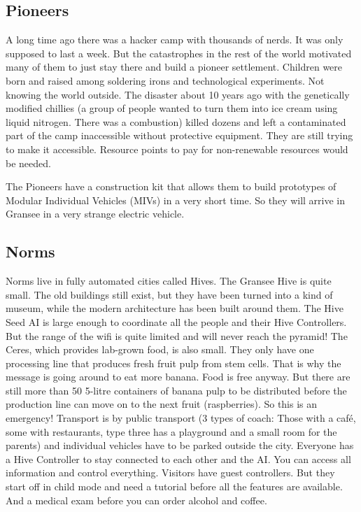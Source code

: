 \subsection{Pioneers}

A long time ago there was a hacker camp with thousands of nerds. It was only supposed to last a week. But the catastrophes in the rest of the world motivated many of them to just stay there and build a pioneer settlement. Children were born and raised among soldering irons and technological experiments. Not knowing the world outside. The disaster about 10 years ago with the genetically modified chillies (a group of people wanted to turn them into ice cream using liquid nitrogen. There was a combustion) killed dozens and left a contaminated part of the camp inaccessible without protective equipment. They are still trying to make it accessible. Resource points to pay for non-renewable resources would be needed.

The Pioneers have a construction kit that allows them to build prototypes of Modular Individual Vehicles (MIVs) in a very short time. So they will arrive in Gransee in a very strange electric vehicle.

\subsection{Norms}

Norms live in fully automated cities called Hives. The Gransee Hive is quite small. The old buildings still exist, but they have been turned into a kind of museum, while the modern architecture has been built around them. The Hive Seed AI is large enough to coordinate all the people and their Hive Controllers. But the range of the wifi is quite limited and will never reach the pyramid!
The Ceres, which provides lab-grown food, is also small. They only have one processing line that produces fresh fruit pulp from stem cells. That is why the message is going around to eat more banana. Food is free anyway. But there are still more than 50 5-litre containers of banana pulp to be distributed before the production line can move on to the next fruit (raspberries). So this is an emergency!
Transport is by public transport (3 types of coach: Those with a café, some with restaurants, type three has a playground and a small room for the parents) and individual vehicles have to be parked outside the city.
Everyone has a Hive Controller to stay connected to each other and the AI. You can access all information and control everything. Visitors have guest controllers. But they start off in child mode and need a tutorial before all the features are available. And a medical exam before you can order alcohol and coffee.


